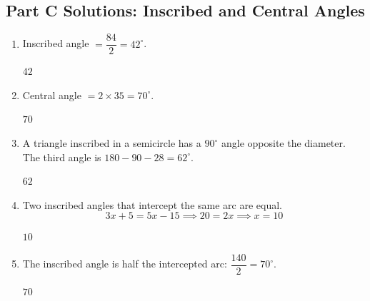 \documentclass[14pt]{extarticle}
\begin{document}
\subsection*{Part C Solutions: Inscribed and Central Angles}
\begin{enumerate}
  \item Inscribed angle \(= \dfrac{84}{2} = 42^\circ\).

  \(\boxed{42}\)

  \item Central angle \(= 2 \times 35 = 70^\circ\).

  \(\boxed{70}\)

  \item A triangle inscribed in a semicircle has a \(90^\circ\) angle opposite the diameter. The third angle is \(180 - 90 - 28 = 62^\circ\).

  \(\boxed{62}\)

  \item Two inscribed angles that intercept the same arc are equal.
  \[
  3x + 5 = 5x - 15 \implies 20 = 2x \implies x = 10
  \]

  \(\boxed{10}\)

  \item The inscribed angle is half the intercepted arc: \(\dfrac{140}{2} = 70^\circ\).

  \(\boxed{70}\)
\end{enumerate}
\end{document}
